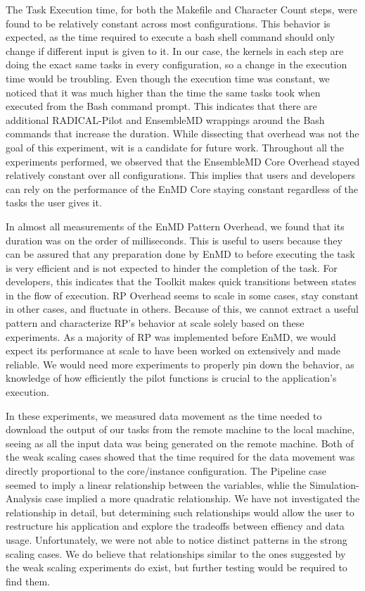 \documentclass[]{article}
\begin{document}
	The Task Execution time, for both the Makefile and Character Count steps, were found to be relatively constant across most configurations. This behavior is expected, as the time required to execute a bash shell command should only change if different input is given to it. In our case, the kernels in each step are doing the exact same tasks in every configuration, so a change in the execution time would be troubling. Even though the execution time was constant, we noticed that it was much higher than the time the same tasks took when executed from the Bash command prompt. This indicates that there are additional RADICAL-Pilot and EnsembleMD wrappings around the Bash commands that increase the duration. While dissecting that overhead was not the goal of this experiment, wit is a candidate for future work.
	Throughout all the experiments performed, we observed that the EnsembleMD Core Overhead stayed relatively constant over all configurations. This implies that users and developers can rely on the performance of the EnMD Core staying constant regardless of the tasks the user gives it.
	
	In almost all measurements of the EnMD Pattern Overhead, we found that its duration was on the order of milliseconds. This is useful to users because they can be assured that any preparation done by EnMD to before executing the task is very efficient and is not expected to hinder the completion of the task. For developers, this indicates that the Toolkit makes quick transitions between states in the flow of execution.
	RP Overhead seems to scale in some cases, stay constant in other cases, and fluctuate in others. Because of this, we cannot extract a useful pattern and characterize RP's behavior at scale solely based on these experiments. As a majority of RP was implemented before EnMD, we would expect its performance at scale to have been worked on extensively and made reliable. We would need more experiments to properly pin down the behavior, as knowledge of how efficiently the pilot functions is crucial to the application's execution.

    In these experiments, we measured data movement as the time needed to download the output of our tasks from the remote machine to the local machine, seeing as all the input data was being generated on the remote machine. Both of the weak scaling cases showed that the time required for the data movement was directly proportional to the core/instance configuration. The Pipeline case seemed to imply a linear relationship between the variables, whlie the Simulation-Analysis case implied a more quadratic relationship. We have not investigated the relationship in detail, but determining such relationships would allow the user to restructure his application and explore the tradeoffs between effiency and data usage. Unfortunately, we were not able to notice distinct patterns in the strong scaling cases. We do believe that relationships similar to the ones suggested by the weak scaling experiments do exist, but further testing would be required to find them.
\end{document}
